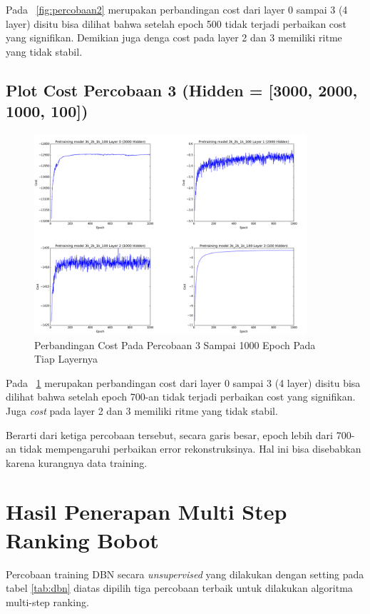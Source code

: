 Pada \pic~\ref{fig:percobaan2} merupakan perbandingan cost dari layer 0 sampai 3 (4 layer) disitu bisa dilihat bahwa setelah epoch 500 tidak terjadi perbaikan cost yang signifikan. Demikian juga denga cost pada layer 2 dan 3 memiliki ritme yang tidak stabil.

\subsection{Plot Cost Percobaan 3 (Hidden = [3000, 2000, 1000, 100])}
\begin{figure}
	\centering
	\includegraphics[width=0.9\textwidth]
		{pics/percobaan_3.png}
	\caption{Perbandingan Cost Pada Percobaan 3 Sampai 1000 Epoch Pada Tiap Layernya}
	\label{fig:percobaan3}
\end{figure}
Pada \pic~\ref{fig:percobaan3} merupakan perbandingan cost dari layer 0 sampai 3 (4 layer) disitu bisa dilihat bahwa setelah epoch 700-an tidak terjadi perbaikan cost yang signifikan. Juga \textit{cost} pada layer 2 dan 3 memiliki ritme yang tidak stabil.

Berarti dari ketiga percobaan tersebut, secara garis besar, epoch lebih dari 700-an tidak mempengaruhi perbaikan error rekonstruksinya. Hal ini bisa disebabkan karena kurangnya data training.


\section{Hasil Penerapan Multi Step Ranking Bobot}

Percobaan training DBN secara \textit{unsupervised} yang dilakukan dengan setting pada tabel \ref{tab:dbn} diatas dipilih tiga percobaan terbaik untuk dilakukan algoritma multi-step ranking.

